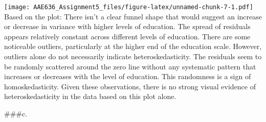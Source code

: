 \documentclass[
]{article}
\newenvironment{Shaded}{\begin{snugshade}}{\end{snugshade}}
\newcommand{\AttributeTok}[1]{\textcolor[rgb]{0.13,0.29,0.53}{#1}}
\newcommand{\CommentTok}[1]{\textcolor[rgb]{0.56,0.35,0.01}{\textit{#1}}}
\newcommand{\DecValTok}[1]{\textcolor[rgb]{0.00,0.00,0.81}{#1}}
\newcommand{\FunctionTok}[1]{\textcolor[rgb]{0.13,0.29,0.53}{\textbf{#1}}}
\newcommand{\NormalTok}[1]{#1}
\newcommand{\OtherTok}[1]{\textcolor[rgb]{0.56,0.35,0.01}{#1}}
\newcommand{\SpecialCharTok}[1]{\textcolor[rgb]{0.81,0.36,0.00}{\textbf{#1}}}
\newcommand{\StringTok}[1]{\textcolor[rgb]{0.31,0.60,0.02}{#1}}
\begin{document}
\begin{Shaded}
\end{Shaded}

\texttt{[image: AAE636\_Assignment5\_files/figure-latex/unnamed-chunk-7-1.pdf]}
Based on the plot: There isn't a clear funnel shape that would suggest
an increase or decrease in variance with higher levels of education. The
spread of residuals appears relatively constant across different levels
of education. There are some noticeable outliers, particularly at the
higher end of the education scale. However, outliers alone do not
necessarily indicate heteroskedasticity. The residuals seem to be
randomly scattered around the zero line without any systematic pattern
that increases or decreases with the level of education. This randomness
is a sign of homoskedasticity. Given these observations, there is no
strong visual evidence of heteroskedasticity in the data based on this
plot alone.

\#\#\#c.

\begin{Shaded}
\end{Shaded}
\end{document}
